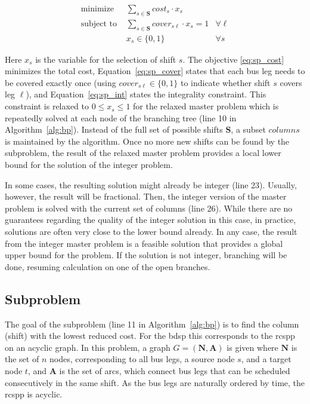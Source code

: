 \documentclass[]{amsart}
\theoremstyle{plain}
\begin{document}
\begin{align}
\label{eq:sp_cost}
\text{minimize } &\sum_{s\in\mathbf{S}}{\mathit{cost}_s\cdot x_s}\\
\label{eq:sp_cover}
\text{subject to } &\sum_{s\in\mathbf{S}}{\mathit{cover}_{s\ell}\cdot x_s}=1 &\forall\ell\\
\label{eq:sp_int}
& x_s\in\{0,1\} &\forall s
\end{align}

\noindent
Here $x_s$ is the variable for the selection of shift $s$. The objective \eqref{eq:sp_cost} minimizes the total cost, Equation~\eqref{eq:sp_cover} states that each bus leg needs to be covered exactly once (using $\mathit{cover}_{s\ell}\in\{0,1\}$ to indicate whether shift $s$ covers leg $\ell$), and Equation~\eqref{eq:sp_int} states the integrality constraint. This constraint is relaxed to $0\leq x_s\leq1$ for the relaxed master problem which is repeatedly solved at each node of the branching tree (line 10 in Algorithm~\ref{alg:bp}). Instead of the full set of possible shifts $\mathbf{S}$, a subset $columns$ is maintained by the algorithm. Once no more new shifts can be found by the subproblem, the result of the relaxed master problem provides a local lower bound for the solution of the integer problem.

In some cases, the resulting solution might already be integer (line 23). Usually, however, the result will be fractional. Then, the integer version of the master problem is solved with the current set of columns (line 26). While there are no guarantees regarding the quality of the integer solution in this case, in practice, solutions are often very close to the lower bound already. In any case, the result from the integer master problem is a feasible solution that provides a global upper bound for the problem. If the solution is not integer, branching will be done, resuming calculation on one of the open branches.

\subsection{Subproblem}

The goal of the subproblem (line 11 in Algorithm~\ref{alg:bp}) is to find the column (shift) with the lowest reduced cost. For the \gls{bdsp} this corresponds to the \acrfull{rcspp} on an acyclic graph. In this problem, a graph $G=(\mathbf{N},\mathbf{A})$ is given where $\mathbf{N}$ is the set of $n$ nodes, corresponding to all bus legs, a source node $s$, and a target node $t$, and $\mathbf{A}$ is the set of arcs, which connect bus legs that can be scheduled consecutively in the same shift. As the bus legs are naturally ordered by time, the \gls{rcspp} is acyclic.
\end{document}

